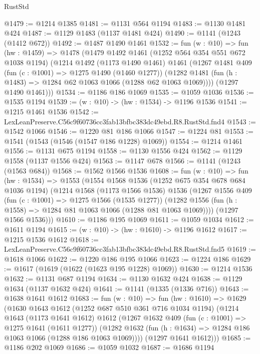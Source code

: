 \begin{lexlean}{RustStd}
\begin{coremodule}
@1479 := @1214 @1385
@1481 := @1131 @564 @1194
@1483 := @1130 @1481 @424
@1487 := @1129 @1483 (@1137 @1481 @424)
@1490 := @1141 (@1243 (@1412 @672))
@1492 := @1487 @1490 @1461
@1532 := fun (w : @10) =>
  fun (hw : @1459) =>
  @1478
    (@1479
      @1492
      @1461
      (@1252 @564 @354 @551 @672 @1038 @1194)
      (@1214
        @1492
        (@1173 @1490 @1461)
        @1461
        (@1267
          @1481
          @409
          (fun (c : @1001) => @1275 @1490 (@1460 @1277))
          (@1282 @1481 (fun (h : @1483) => @1284 @62 @1063 @1066 (@1288 @62 @1063 @1069))))
        (@1297 @1490 @1461)))
@1534 := @1186 @186 @1069
@1535 := @1059 @1036
@1536 := @1535 @1194
@1539 := (w : @10) -> (hw : @1534) -> @1196 @1536
@1541 := @1215 @1461 @1536
@1542 := LexLeanPreserve.C56c9f60736cc3fab13bfbc383dc49ebd.R8.RustStd.fnd4
@1543 := @1542 @1066
@1546 := @1220 @81 @186 @1066
@1547 := @1224 @81
@1553 := @1541 (@1543 (@1546 (@1547 @186 @1228) @1069))
@1554 := @1214 @1461
@1556 := @1131 @675 @1194
@1558 := @1130 @1556 @424
@1562 := @1129 @1558 (@1137 @1556 @424)
@1563 := @1147 @678
@1566 := @1141 (@1243 (@1563 @684))
@1568 := @1562 @1566 @1536
@1608 := fun (w : @10) =>
  fun (hw : @1534) =>
  @1553
    (@1554
      @1568
      @1536
      (@1252 @675 @354 @678 @684 @1036 @1194)
      (@1214
        @1568
        (@1173 @1566 @1536)
        @1536
        (@1267
          @1556
          @409
          (fun (c : @1001) => @1275 @1566 (@1535 @1277))
          (@1282 @1556 (fun (h : @1558) => @1284 @81 @1063 @1066 (@1288 @81 @1063 @1069))))
        (@1297 @1566 @1536)))
@1610 := @1186 @195 @1069
@1611 := @1059 @1034
@1612 := @1611 @1194
@1615 := (w : @10) -> (hw : @1610) -> @1196 @1612
@1617 := @1215 @1536 @1612
@1618 := LexLeanPreserve.C56c9f60736cc3fab13bfbc383dc49ebd.R8.RustStd.fnd5
@1619 := @1618 @1066
@1622 := @1220 @186 @195 @1066
@1623 := @1224 @186
@1629 := @1617 (@1619 (@1622 (@1623 @195 @1228) @1069))
@1630 := @1214 @1536
@1632 := @1131 @687 @1194
@1634 := @1130 @1632 @424
@1638 := @1129 @1634 (@1137 @1632 @424)
@1641 := @1141 (@1335 (@1336 @716))
@1643 := @1638 @1641 @1612
@1683 := fun (w : @10) =>
  fun (hw : @1610) =>
  @1629
    (@1630
      @1643
      @1612
      (@1252 @687 @510 @361 @716 @1034 @1194)
      (@1214
        @1643
        (@1173 @1641 @1612)
        @1612
        (@1267
          @1632
          @409
          (fun (c : @1001) => @1275 @1641 (@1611 @1277))
          (@1282 @1632 (fun (h : @1634) => @1284 @186 @1063 @1066 (@1288 @186 @1063 @1069))))
        (@1297 @1641 @1612)))
@1685 := @1186 @202 @1069
@1686 := @1059 @1032
@1687 := @1686 @1194

\end{coremodule}
\end{lexlean}
